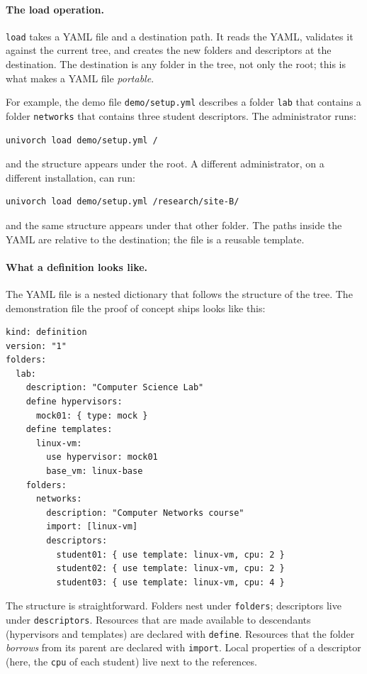 \paragraph{The load operation.}
\texttt{load} takes a YAML file and a destination path. It reads the
YAML, validates it against the current tree, and creates the new
folders and descriptors at the destination. The destination is any
folder in the tree, not only the root; this is what makes a YAML
file \emph{portable}.

For example, the demo file \texttt{demo/setup.yml} describes a
folder \texttt{lab} that contains a folder \texttt{networks} that
contains three student descriptors. The administrator runs:

\begin{verbatim}
univorch load demo/setup.yml /
\end{verbatim}

and the structure appears under the root. A different
administrator, on a different installation, can run:

\begin{verbatim}
univorch load demo/setup.yml /research/site-B/
\end{verbatim}

and the same structure appears under that other folder. The paths
inside the YAML are relative to the destination; the file is a
reusable template.

\paragraph{What a definition looks like.}
The YAML file is a nested dictionary that follows the structure of
the tree. The demonstration file the proof of concept ships looks
like this:

\begin{verbatim}
kind: definition
version: "1"
folders:
  lab:
    description: "Computer Science Lab"
    define hypervisors:
      mock01: { type: mock }
    define templates:
      linux-vm:
        use hypervisor: mock01
        base_vm: linux-base
    folders:
      networks:
        description: "Computer Networks course"
        import: [linux-vm]
        descriptors:
          student01: { use template: linux-vm, cpu: 2 }
          student02: { use template: linux-vm, cpu: 2 }
          student03: { use template: linux-vm, cpu: 4 }
\end{verbatim}

The structure is straightforward. Folders nest under
\texttt{folders}; descriptors live under \texttt{descriptors}.
Resources that are made available to descendants (hypervisors and
templates) are declared with \texttt{define}. Resources that the
folder \emph{borrows} from its parent are declared with
\texttt{import}. Local properties of a descriptor (here, the
\texttt{cpu} of each student) live next to the references.

